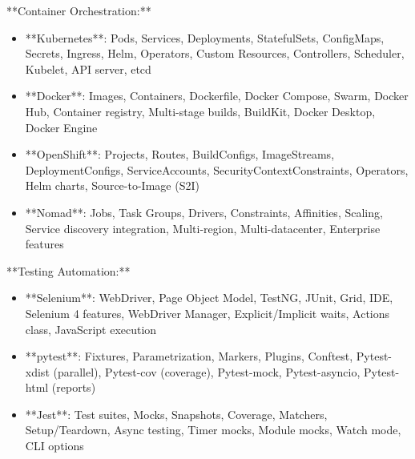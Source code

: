 \documentclass[11pt,a4paper]{article}
\begin{document}
**Container Orchestration:**

\begin{itemize}
\item **Kubernetes**: Pods, Services, Deployments, StatefulSets, ConfigMaps, Secrets, Ingress, Helm, Operators, Custom Resources, Controllers, Scheduler, Kubelet, API server, etcd
\end{itemize}

\begin{itemize}
\item **Docker**: Images, Containers, Dockerfile, Docker Compose, Swarm, Docker Hub, Container registry, Multi-stage builds, BuildKit, Docker Desktop, Docker Engine
\end{itemize}

\begin{itemize}
\item **OpenShift**: Projects, Routes, BuildConfigs, ImageStreams, DeploymentConfigs, ServiceAccounts, SecurityContextConstraints, Operators, Helm charts, Source-to-Image (S2I)
\end{itemize}

\begin{itemize}
\item **Nomad**: Jobs, Task Groups, Drivers, Constraints, Affinities, Scaling, Service discovery integration, Multi-region, Multi-datacenter, Enterprise features
\end{itemize}

**Testing Automation:**

\begin{itemize}
\item **Selenium**: WebDriver, Page Object Model, TestNG, JUnit, Grid, IDE, Selenium 4 features, WebDriver Manager, Explicit/Implicit waits, Actions class, JavaScript execution
\end{itemize}

\begin{itemize}
\item **pytest**: Fixtures, Parametrization, Markers, Plugins, Conftest, Pytest-xdist (parallel), Pytest-cov (coverage), Pytest-mock, Pytest-asyncio, Pytest-html (reports)
\end{itemize}

\begin{itemize}
\item **Jest**: Test suites, Mocks, Snapshots, Coverage, Matchers, Setup/Teardown, Async testing, Timer mocks, Module mocks, Watch mode, CLI options
\end{itemize}
\end{document}
